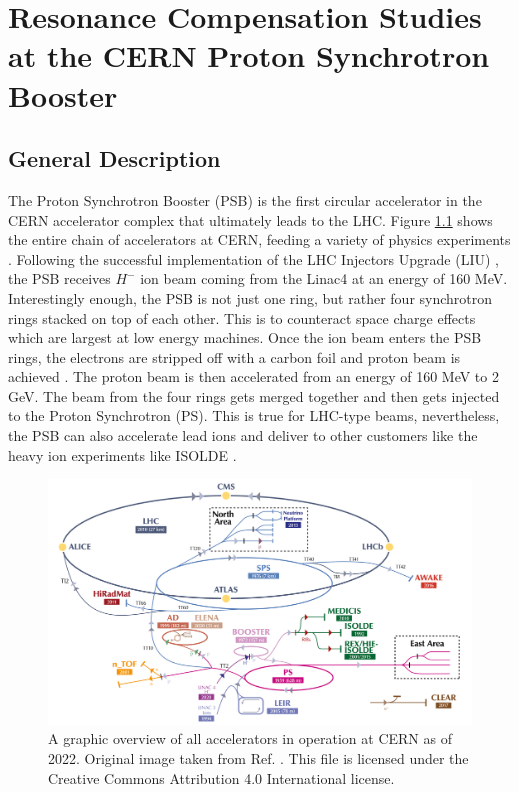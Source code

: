 \chapter{Resonance Compensation Studies at the CERN Proton Synchrotron Booster}
\label{sec:ch5}

\section{General Description}
The Proton Synchrotron Booster (PSB) is the first circular accelerator in the CERN accelerator complex that ultimately leads to the LHC. Figure \ref{fig:cernac} shows the entire chain of accelerators at CERN, feeding a variety of physics experiments \cite{cernplot}. Following the successful implementation of the LHC Injectors Upgrade (LIU) \cite{liu}, the PSB receives $H^-$ ion beam coming from the Linac4 at an energy of 160 MeV. Interestingly enough, the PSB is not just one ring, but rather four synchrotron rings stacked on top of each other. This is to counteract space charge effects which are largest at low energy machines. Once the ion beam enters the PSB rings, the electrons are stripped off with a carbon foil and proton beam is achieved \cite{psbstrip}. The proton beam is then accelerated from an energy of 160 MeV to 2 GeV. The beam from the four rings gets merged together and then gets injected to the Proton Synchrotron (PS). This is true for LHC-type beams, nevertheless, the PSB can also accelerate lead ions and deliver to other customers like the heavy ion experiments like ISOLDE \cite{foteini1}.   \cite{foteini2} 

\begin{figure}[H]
    \centering
    \includegraphics[width=\linewidth]{chapter5/CERN_AC.png}
    \caption{A graphic overview of all accelerators in operation at CERN as of 2022. Original image taken from Ref. \cite{cernplot}. This file is licensed under the Creative Commons Attribution 4.0 International license.}
    \label{fig:cernac}
\end{figure}


